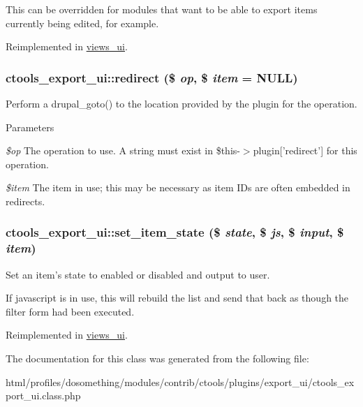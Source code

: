 This can be overridden for modules that want to be able to export items currently being edited, for example. 

Reimplemented in \hyperlink{classviews__ui_a214105ecb1527a6ccf712fd6ec3f4c0c}{views\_\-ui}.\hypertarget{classctools__export__ui_a0265326b637899471198d0b7c260701d}{
\subsubsection[{redirect}]{\setlength{\rightskip}{0pt plus 5cm}ctools\_\-export\_\-ui::redirect (\$ {\em op}, \/  \$ {\em item} = {\ttfamily NULL})}}
\label{classctools__export__ui_a0265326b637899471198d0b7c260701d}
Perform a drupal\_\-goto() to the location provided by the plugin for the operation.


\begin{DoxyParams}{Parameters}
\item[{\em \$op}]The operation to use. A string must exist in \$this-\/$>$plugin\mbox{[}'redirect'\mbox{]} for this operation. \item[{\em \$item}]The item in use; this may be necessary as item IDs are often embedded in redirects. \end{DoxyParams}
\hypertarget{classctools__export__ui_a60998d27b8d164122f1898a97a5666bf}{
\subsubsection[{set\_\-item\_\-state}]{\setlength{\rightskip}{0pt plus 5cm}ctools\_\-export\_\-ui::set\_\-item\_\-state (\$ {\em state}, \/  \$ {\em js}, \/  \$ {\em input}, \/  \$ {\em item})}}
\label{classctools__export__ui_a60998d27b8d164122f1898a97a5666bf}
Set an item's state to enabled or disabled and output to user.

If javascript is in use, this will rebuild the list and send that back as though the filter form had been executed. 

Reimplemented in \hyperlink{classviews__ui_afd2f31ed4d97d797f8cb6d11e658545e}{views\_\-ui}.

The documentation for this class was generated from the following file:\begin{DoxyCompactItemize}
\item 
html/profiles/dosomething/modules/contrib/ctools/plugins/export\_\-ui/ctools\_\-export\_\-ui.class.php\end{DoxyCompactItemize}
